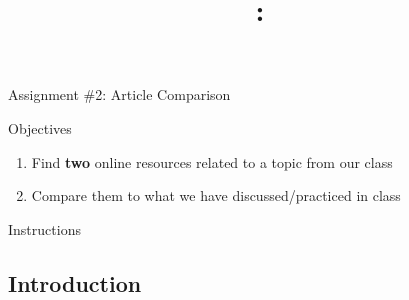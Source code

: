 \documentclass[letterpaper]{article}
\title{\course{}: \activity{}}
\date{}
\newcommand{\activity}{Assignment \#2}
\newcommand{\horizrule}{\noindent\rule{\linewidth}{0.15mm}}
\begin{document}
\reversemarginpar

\begin{center}
  \Large{\activity{}: Article Comparison}
\end{center}

\begin{center}
  \large{Objectives}

\begin{enumerate}
\item Find {\bf two} online resources related to a topic from our class
\item Compare them to what we have discussed/practiced in class
\end{enumerate}
\end{center}


\begin{center}
  \large{Instructions}
\end{center}


\subsection*{Introduction}
\end{document}
